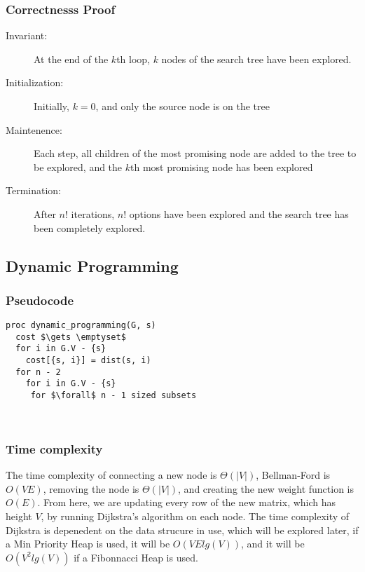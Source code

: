 \documentclass[a4paper,12pt]{article}
\begin{document}
\subsubsection{Correctnesss Proof}
\begin{description}
\item [Invariant: ] At the end of the $k$th loop, $k$ nodes of the search tree have been explored.
\item [Initialization: ] Initially, $k = 0$, and only the source node is on the tree 
\item [Maintenence: ] Each step, all children of the most promising node are added to the tree to be explored, and the $k$th most promising node has been explored
\item [Termination: ] After $n!$ iterations, $n!$ options have been explored and the search tree has been completely explored.
\end{description}
\subsection{Dynamic Programming}
\subsubsection{Pseudocode}
\begin{lstlisting}[mathescape=true]
proc dynamic_programming(G, s)
  cost $\gets \emptyset$
  for i in G.V - {s}
    cost[{s, i}] = dist(s, i)
  for n - 2
    for i in G.V - {s}
     for $\forall$ n - 1 sized subsets
       
      
\end{lstlisting}
\subsubsection{Time complexity}
The time complexity of connecting a new node is $\Theta(|V|)$, Bellman-Ford is $O(VE)$, removing the node is $\Theta(|V|)$, and creating the new weight function is $O(E)$. From here, we are updating every row of the new matrix, which has height $V$, by running Dijkstra's algorithm on each node. The time complexity of Dijkstra is depenedent on the data strucure in use, which will be explored later, if a Min Priority Heap is used, it will be $O(VElg(V))$, and it will be $O(V^2lg(V))$ if a Fibonnacci Heap is used.
\end{document}
